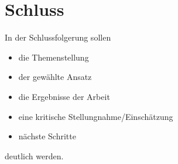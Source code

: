 \section{Schluss} %
In der Schlussfolgerung sollen
\begin{itemize}
 \item die Themenstellung
 \item der gewählte Ansatz
 \item die Ergebnisse der Arbeit
 \item eine kritische Stellungnahme/Einschätzung
 \item nächste Schritte
\end{itemize}
deutlich werden.